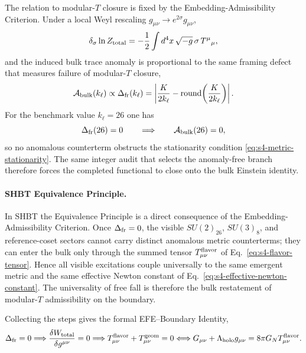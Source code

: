 \documentclass[11pt]{article}
\begin{document}
The relation to modular-$T$ closure is fixed by the Embedding-Admissibility
Criterion. Under a local Weyl rescaling $g_{\mu\nu}\to e^{2\sigma}g_{\mu\nu}$,
\begin{equation}
 \delta_{\sigma}\ln Z_{\rm total}
 =
 -\frac12\int d^4x\,\sqrt{-g}\,\sigma\,T^{\mu}{}_{\mu},
\end{equation}
and the induced bulk trace anomaly is proportional to the same framing defect
that measures failure of modular-$T$ closure,
\begin{equation}
 \mathcal A_{\rm bulk}(k_{\ell})
 \propto
 \Delta_{\rm fr}(k_{\ell})
 =
 \left| \frac{K}{2k_{\ell}} - \text{round}\!\left(\frac{K}{2k_{\ell}}\right) \right|.
\end{equation}
For the benchmark value $k_{\ell}=26$ one has
\begin{equation}
 \Delta_{\rm fr}(26)=0
 \qquad\Longrightarrow\qquad
 \mathcal A_{\rm bulk}(26)=0,
\end{equation}
so no anomalous counterterm obstructs the stationarity condition
\eqref{eq:s4-metric-stationarity}. The same integer audit that selects the
anomaly-free branch therefore forces the completed functional to close onto the
bulk Einstein identity.

\paragraph{SHBT Equivalence Principle.}
In SHBT the Equivalence Principle is a direct consequence of the
Embedding-Admissibility Criterion. Once $\Delta_{\rm fr}=0$, the visible
$SU(2)_{26}$, $SU(3)_8$, and reference-coset sectors cannot carry distinct
anomalous metric counterterms; they can enter the bulk only through the summed
tensor $T_{\mu\nu}^{\rm flavor}$ of Eq.~\eqref{eq:s4-flavor-tensor}. Hence all
visible excitations couple universally to the same emergent metric and the same
effective Newton constant of Eq.~\eqref{eq:s4-effective-newton-constant}. The
universality of free fall is therefore the bulk restatement of modular-$T$
admissibility on the boundary.

Collecting the steps gives the formal EFE--Boundary Identity,
\begin{equation}
\label{eq:s4-efe-boundary-identity}
 \Delta_{\rm fr}=0
 \Longrightarrow
 \frac{\delta W_{\rm total}}{\delta g^{\mu\nu}}=0
 \Longrightarrow
 T_{\mu\nu}^{\rm flavor}+T_{\mu\nu}^{\rm geom}=0
 \Longleftrightarrow
 G_{\mu\nu}+\Lambda_{\rm holo}g_{\mu\nu}=8\pi G_N T_{\mu\nu}^{\rm flavor}.
\end{equation}
\end{document}
